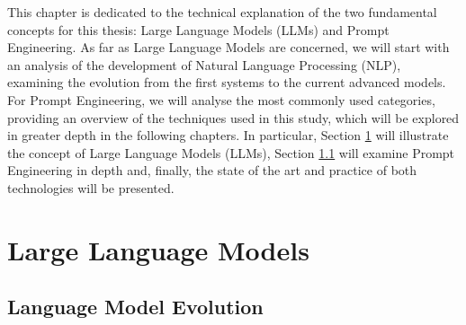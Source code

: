This chapter is dedicated to the technical explanation of the two fundamental concepts for this thesis: Large Language Models (LLMs) and Prompt Engineering. As far as Large Language Models are concerned, we will start with an analysis of the development of Natural Language Processing (NLP), examining the evolution from the first systems to the current advanced models.
For Prompt Engineering, we will analyse the most commonly used categories, providing an overview of the techniques used in this study, which will be explored in greater depth in the following chapters.
In particular, Section \ref{sec:LLMs} will illustrate the concept of Large Language Models (LLMs), Section \ref{sec:Evolution} will examine Prompt Engineering in depth and, finally, the state of the art and practice of both technologies will be presented.

\section{Large Language Models}
\label{sec:LLMs}
\subsection{Language Model Evolution}
\label{sec:Evolution}

